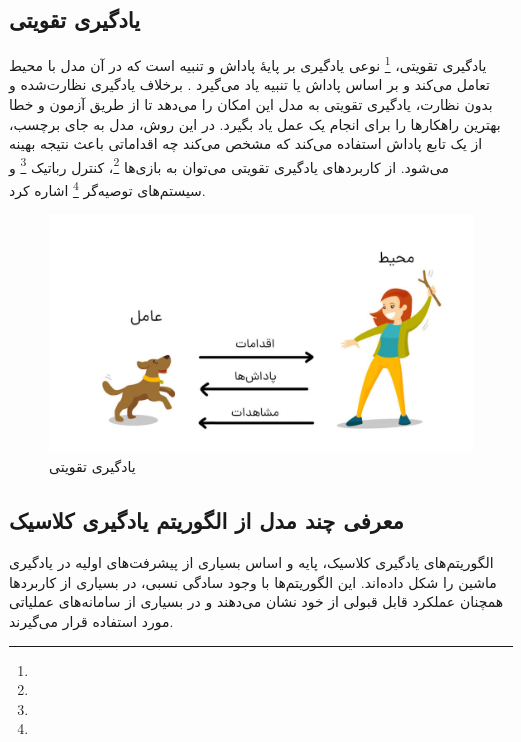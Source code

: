 \subsection{یادگیری تقویتی}
یادگیری تقویتی، \footnote{} نوعی یادگیری بر پایهٔ پاداش و تنبیه است که در آن مدل با محیط تعامل می‌کند و بر اساس پاداش یا تنبیه یاد می‌گیرد
\cite{sutton2018reinforcement}.
برخلاف یادگیری نظارت‌شده و بدون نظارت، یادگیری تقویتی به مدل این امکان را می‌دهد تا از طریق آزمون و خطا بهترین راهکارها را برای انجام یک عمل یاد بگیرد. در این روش، مدل به جای برچسب، از یک تابع پاداش استفاده می‌کند که مشخص می‌کند چه اقداماتی باعث نتیجه بهینه می‌شود. از کاربردهای یادگیری تقویتی می‌توان به بازی‌ها \footnote{}، کنترل رباتیک \footnote{} و سیستم‌های توصیه‌گر \footnote{} اشاره کرد.



\begin{figure}[h]
	\centering
	\begin{minipage}[b]{0.8\textwidth}
		\centering
		\includegraphics[width=\textwidth]{transformer_images/reinforcement_learning.jpg}
		\caption{یادگیری تقویتی}
		\label{fig:reinforcement learning}
	\end{minipage}
	\hfill
\end{figure}



\subsection{معرفی چند مدل از الگوریتم یادگیری کلاسیک}

الگوریتم‌های یادگیری کلاسیک، پایه و اساس بسیاری از پیشرفت‌های اولیه در یادگیری ماشین را شکل داده‌اند. این الگوریتم‌ها با وجود سادگی نسبی، در بسیاری از کاربردها همچنان عملکرد قابل قبولی از خود نشان می‌دهند و در بسیاری از سامانه‌های عملیاتی مورد استفاده قرار می‌گیرند.

